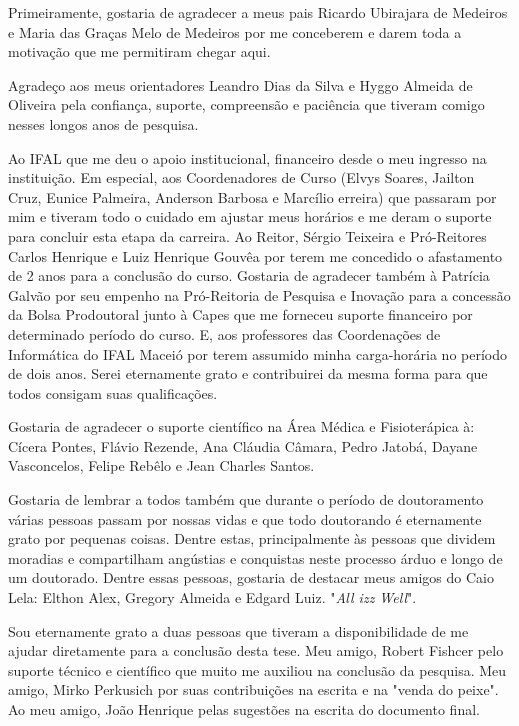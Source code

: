 Primeiramente, gostaria de agradecer a meus pais Ricardo Ubirajara de Medeiros e Maria das Graças Melo de Medeiros por me conceberem e darem toda a motivação que me permitiram chegar aqui.

Agradeço aos meus orientadores Leandro Dias da Silva e Hyggo Almeida de Oliveira pela confiança, suporte, compreensão e paciência que tiveram comigo nesses longos anos de pesquisa.

Ao IFAL que me deu o apoio institucional, financeiro desde o meu ingresso na instituição. Em especial, aos Coordenadores de Curso (Elvys Soares, Jailton Cruz, Eunice Palmeira, Anderson Barbosa e Marcílio erreira) que passaram por mim e tiveram todo o cuidado em ajustar meus horários e me deram o suporte para concluir esta etapa da carreira. Ao Reitor, Sérgio Teixeira e Pró-Reitores Carlos Henrique e Luiz Henrique Gouvêa por terem me concedido o afastamento de 2 anos para a conclusão do curso. Gostaria de agradecer também à Patrícia Galvão por seu empenho na Pró-Reitoria de Pesquisa e Inovação para a concessão da Bolsa Prodoutoral junto à Capes que me forneceu suporte financeiro por determinado período do curso. E, aos professores das Coordenações de Informática do IFAL Maceió por terem assumido minha carga-horária no período de dois anos. Serei eternamente grato e contribuirei da mesma forma para que todos consigam suas qualificações.

Gostaria de agradecer o suporte científico na Área Médica e Fisioterápica à: Cícera Pontes, Flávio Rezende, Ana Cláudia Câmara, Pedro Jatobá, Dayane Vasconcelos, Felipe Rebêlo e Jean Charles Santos.

Gostaria de lembrar a todos também que durante o período de doutoramento várias pessoas passam por nossas vidas e que todo doutorando é eternamente grato por pequenas coisas. Dentre estas, principalmente às pessoas que dividem moradias e compartilham angústias e conquistas neste processo árduo e longo de um doutorado. Dentre essas pessoas, gostaria de destacar meus amigos do Caio Lela: Elthon Alex, Gregory Almeida e Edgard Luiz. "\textit{All izz Well}".

Sou eternamente grato a duas pessoas que tiveram a disponibilidade de me ajudar diretamente para a conclusão desta tese. Meu amigo, Robert Fishcer pelo suporte técnico e científico que muito me auxiliou na conclusão da pesquisa. Meu amigo, Mirko Perkusich por suas contribuições na escrita e na "venda do peixe". Ao meu amigo, João Henrique pelas sugestões na escrita do documento final.


